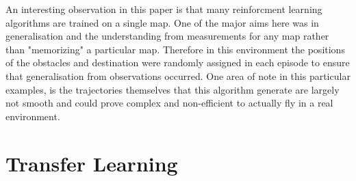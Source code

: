 An interesting observation in this paper is that many reinforcment learning algorithms are trained on a single map.
One of the major aims here was in generalisation and the understanding from measurements for any map rather than "memorizing" a particular map.
Therefore in this environment the positions of the obstacles and destination were randomly assigned in each episode to ensure that generalisation from observations occurred.
One area of note in this particular examples, is the trajectories themselves that this algorithm generate are largely not smooth and could prove complex and non-efficient to actually fly in a real environment.



\section{Transfer Learning}
